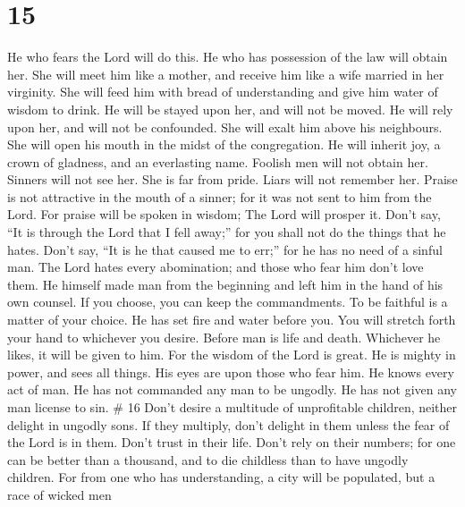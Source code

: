 \hypertarget{section-12}{%
\section{15}\label{section-12}}

 He who fears the Lord will do this. He who has possession
of the law will obtain her.  She will meet him like a
mother, and receive him like a wife married in her virginity.
 She will feed him with bread of understanding and give him
water of wisdom to drink.  He will be stayed upon her, and
will not be moved. He will rely upon her, and will not be confounded.
 She will exalt him above his neighbours. She will open his
mouth in the midst of the congregation.  He will inherit
joy, a crown of gladness, and an everlasting name.  Foolish
men will not obtain her. Sinners will not see her.  She is
far from pride. Liars will not remember her.  Praise is not
attractive in the mouth of a sinner; for it was not sent to him from the
Lord.  For praise will be spoken in wisdom; The Lord will
prosper it.  Don't say, ``It is through the Lord that I
fell away;'' for you shall not do the things that he hates.
 Don't say, ``It is he that caused me to err;'' for he has
no need of a sinful man.  The Lord hates every abomination;
and those who fear him don't love them.  He himself made
man from the beginning and left him in the hand of his own counsel.
 If you choose, you can keep the commandments. To be
faithful is a matter of your choice.  He has set fire and
water before you. You will stretch forth your hand to whichever you
desire.  Before man is life and death. Whichever he likes,
it will be given to him.  For the wisdom of the Lord is
great. He is mighty in power, and sees all things.  His
eyes are upon those who fear him. He knows every act of man.
 He has not commanded any man to be ungodly. He has not
given any man license to sin. \# 16  Don't desire a
multitude of unprofitable children, neither delight in ungodly sons.
 If they multiply, don't delight in them unless the fear of
the Lord is in them.  Don't trust in their life. Don't rely
on their numbers; for one can be better than a thousand, and to die
childless than to have ungodly children.  For from one who
has understanding, a city will be populated, but a race of wicked men
